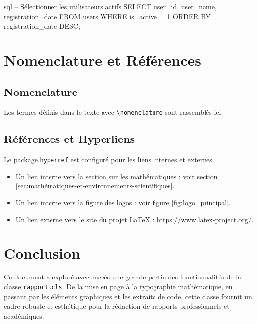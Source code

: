 \documentclass{mytex}
\begin{document}
	\begin{codeboxlang}{sql}
		-- Sélectionner les utilisateurs actifs
		SELECT
		user_id,
		user_name,
		registration_date
		FROM
		users
		WHERE
		is_active = 1
		ORDER BY
		registration_date DESC;
	\end{codeboxlang}
	
	
	\section{Nomenclature et Références}
	
	\subsection{Nomenclature}
	Les termes définis dans le texte avec \verb|\nomenclature| sont rassemblés ici.
	\printnomenclature
	
	\subsection{Références et Hyperliens}
	Le package \texttt{hyperref} est configuré pour les liens internes et externes.
	\begin{itemize}
		\item Un lien interne vers la section sur les mathématiques : voir section \ref{sec:mathématiques-et-environnements-scientifiques}.
		\item Un lien interne vers la figure des logos : voir figure \ref{fig:logo_principal}.
		\item Un lien externe vers le site du projet LaTeX : \url{https://www.latex-project.org/}.
	\end{itemize}
	
	
	\section{Conclusion}
	
	Ce document a exploré avec succès une grande partie des fonctionnalités de la classe \texttt{rapport.cls}. De la mise en page à la typographie mathématique, en passant par les éléments graphiques et les extraits de code, cette classe fournit un cadre robuste et esthétique pour la rédaction de rapports professionnels et académiques.
	
	\merci
	
\end{document}
